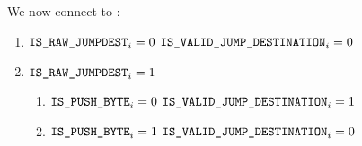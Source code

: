 We now connect \ISVALIDJUMPDESTINATION{} to \IRJD{}:
\begin{enumerate}
    \item \If $\texttt{IS\_RAW\_JUMPDEST} _{i} = 0$ \Then $\texttt{IS\_VALID\_JUMP\_DESTINATION} _{i} = 0$
    \item \If $\texttt{IS\_RAW\_JUMPDEST} _{i} = 1$ \Then
        \begin{enumerate}
            \item \If $\texttt{IS\_PUSH\_BYTE} _{i} = 0$ \Then $\texttt{IS\_VALID\_JUMP\_DESTINATION} _{i} = 1$
            \item \If $\texttt{IS\_PUSH\_BYTE} _{i} = 1$ \Then $\texttt{IS\_VALID\_JUMP\_DESTINATION} _{i} = 0$
        \end{enumerate}
\end{enumerate}

